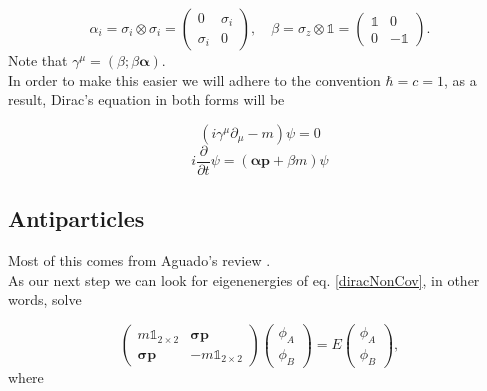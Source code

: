 \begin{equation}
    \alpha_i = \sigma_i \otimes \sigma_i  = \begin{pmatrix}
    0 & \sigma_i\\
    \sigma_i & 0
    \end{pmatrix}, \quad \beta = \sigma_z \otimes \mathbb{1}  = \begin{pmatrix}
    \mathbb{1} & 0\\
    0 & -\mathbb{1}
    \end{pmatrix}.
\end{equation}
Note that $\gamma^\mu = (\beta; \beta \bm{\alpha})$.\\

In order to make this easier we will adhere to the convention $\hbar = c = 1$, as a result, Dirac's equation in both forms will be

\begin{equation}
  (i \gamma^\mu \partial_\mu - m)\psi = 0\label{diracCov}
\end{equation}
\begin{equation}
      i\frac{\partial}{\partial t} \psi = ( \bm{\alpha} \bm{p} + \beta m)\psi\label{diracNonCov}
\end{equation}

\subsection{Antiparticles}
Most of this comes from Aguado's review \cite{aguado}.\\

As our next step we can look for eigenenergies of eq. \ref{diracNonCov}, in other words, solve

\begin{equation}
    \begin{pmatrix} 
      m \mathbb{1}_{2\times2} & \bm{\sigma}\bm{p}\\
      \bm{\sigma}\bm{p} & -m\mathbb{1}_{2\times2}
    \end{pmatrix}
    \begin{pmatrix}
     \phi_A\\
     \phi_B
    \end{pmatrix} = E\begin{pmatrix}
     \phi_A\\
     \phi_B
    \end{pmatrix},
    \label{diracMat}
\end{equation}
where

